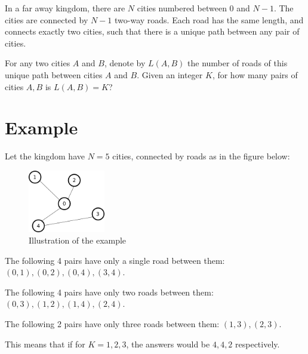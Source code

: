 \newcommand\version{v1}
In a far away kingdom, there are $N$ cities numbered between $0$ and $N - 1$.
The cities are connected by $N - 1$ two-way roads.
Each road has the same length, and connects exactly two cities, such that there is a unique path between any pair of cities.

For any two cities $A$ and $B$, denote by $L(A, B)$ the number of roads of this unique path between cities $A$ and $B$.
Given an integer $K$, for how many pairs of cities $A, B$ is $L(A, B) = K$?

\section*{Example}
Let the kingdom have $N = 5$ cities, connected by roads as in the figure below:
\begin{figure}[h!]
  \centering
  \includegraphics[width=0.3\textwidth]{sample.png}
  \caption{Illustration of the example}
\end{figure}

The following 4 pairs have only a single road between them: $(0, 1), (0, 2), (0, 4), (3, 4)$.

The following 4 pairs have only two roads between them: $(0, 3), (1, 2), (1, 4), (2, 4)$.

The following 2 pairs have only three roads between them: $(1, 3), (2, 3)$.

This means that if for $K = 1, 2, 3$, the answers would be $4, 4, 2$ respectively.

